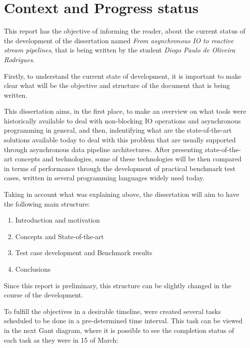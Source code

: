 % 
%  
%
\chapter{Context and Progress status}
\label{cha:introduction}


This report has the objective of informing the reader, about the current status of the development of the dissertation named \textit{From asynchronous IO to reactive stream pipelines}, that is being written by the student \textit{Diogo Paulo de Oliveira Rodrigues}.

Firstly, to understand the current state of development, it is important to make clear what will be the objective and structure of the document that is being written.

This dissertation aims, in the first place, to make an overview on what tools were historically available to deal with non-blocking IO operations and asynchronous programming in general, and then, indentifying what are the state-of-the-art solutions available today to deal with this problem that are usually supported through asynchronous data pipeline architectures.
After presenting state-of-the-art concepts and technologies, some of these technologies will be then compared in terms of performance through the development of practical benchmark test cases, written in several programming languages widely used today.

Taking in account what was explaining above, the dissertation will aim to have the following main structure: 

\begin{enumerate}
	\item Introduction and motivation
	\item Concepts and State-of-the-art
	\item Test case development and Benchmark results 
	\item Conclusions
\end{enumerate}

Since this report is preliminary, this structure can be slightly changed in the course of the development.

To fulfill the objectives in a desirable timeline, were created several tasks scheduled to be done in a pre-determined time interval. This task can be viewed in the  
next Gant diagram, where it is possible to see the completion status of each task as they were in 15 of March:


